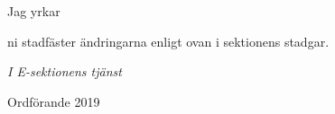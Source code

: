 \documentclass[10pt]{article}
\def\docauthor{Edvard Carlsson}
\begin{document}
    Jag yrkar 
    \begin{attsatser}
    \att ni stadfäster ändringarna enligt ovan i sektionens stadgar. \newline
    \end{attsatser}

\begin{signatures}{1}
    \emph{I E-sektionens tjänst}
    \signature{\docauthor}{Ordförande 2019}
\end{signatures}
\end{document}

